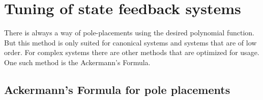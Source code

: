 \chapter{Tuning of state feedback systems}

There is always a way of pole-placements using the desired polynomial function. But this method is only suited for canonical systems and systems that are of low order. For complex systems there are other methods that are optimized for usage. One such method is the Ackermann's Formula.

\section{Ackermann's Formula for pole placements}\label{Sec_AckermannsFormaula_ControllerTuning}


